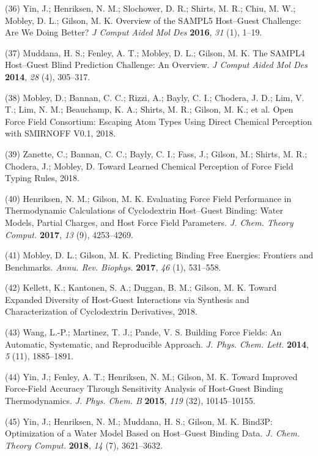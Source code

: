 \documentclass[11pt,notitlepage]{article}
\begin{document}
\leavevmode\hypertarget{ref-BGsUYQln}{}%
(36) Yin, J.; Henriksen, N. M.; Slochower, D. R.; Shirts, M. R.; Chiu,
M. W.; Mobley, D. L.; Gilson, M. K. Overview of the SAMPL5 Host--Guest
Challenge: Are We Doing Better? \emph{J Comput Aided Mol Des}
\textbf{2016}, \emph{31} (1), 1--19.

\leavevmode\hypertarget{ref-GA1AFcUw}{}%
(37) Muddana, H. S.; Fenley, A. T.; Mobley, D. L.; Gilson, M. K. The
SAMPL4 Host--Guest Blind Prediction Challenge: An Overview. \emph{J
Comput Aided Mol Des} \textbf{2014}, \emph{28} (4), 305--317.

\leavevmode\hypertarget{ref-HlBr7NrU}{}%
(38) Mobley, D.; Bannan, C. C.; Rizzi, A.; Bayly, C. I.; Chodera, J. D.;
Lim, V. T.; Lim, N. M.; Beauchamp, K. A.; Shirts, M. R.; Gilson, M. K.;
et al. Open Force Field Consortium: Escaping Atom Types Using Direct
Chemical Perception with SMIRNOFF V0.1, 2018.

\leavevmode\hypertarget{ref-13lTSBgHy}{}%
(39) Zanette, C.; Bannan, C. C.; Bayly, C. I.; Fass, J.; Gilson, M.;
Shirts, M. R.; Chodera, J.; Mobley, D. Toward Learned Chemical
Perception of Force Field Typing Rules, 2018.

\leavevmode\hypertarget{ref-HVgz5rZq}{}%
(40) Henriksen, N. M.; Gilson, M. K. Evaluating Force Field Performance
in Thermodynamic Calculations of Cyclodextrin Host--Guest Binding: Water
Models, Partial Charges, and Host Force Field Parameters. \emph{J. Chem.
Theory Comput.} \textbf{2017}, \emph{13} (9), 4253--4269.

\leavevmode\hypertarget{ref-12BD3oHp4}{}%
(41) Mobley, D. L.; Gilson, M. K. Predicting Binding Free Energies:
Frontiers and Benchmarks. \emph{Annu. Rev. Biophys.} \textbf{2017},
\emph{46} (1), 531--558.

\leavevmode\hypertarget{ref-13gqBX78S}{}%
(42) Kellett, K.; Kantonen, S. A.; Duggan, B. M.; Gilson, M. K. Toward
Expanded Diversity of Host-Guest Interactions via Synthesis and
Characterization of Cyclodextrin Derivatives, 2018.

\leavevmode\hypertarget{ref-JFWYe0Pp}{}%
(43) Wang, L.-P.; Martinez, T. J.; Pande, V. S. Building Force Fields:
An Automatic, Systematic, and Reproducible Approach. \emph{J. Phys.
Chem. Lett.} \textbf{2014}, \emph{5} (11), 1885--1891.

\leavevmode\hypertarget{ref-xRauI5mb}{}%
(44) Yin, J.; Fenley, A. T.; Henriksen, N. M.; Gilson, M. K. Toward
Improved Force-Field Accuracy Through Sensitivity Analysis of Host-Guest
Binding Thermodynamics. \emph{J. Phys. Chem. B} \textbf{2015},
\emph{119} (32), 10145--10155.

\leavevmode\hypertarget{ref-NeqIQDLp}{}%
(45) Yin, J.; Henriksen, N. M.; Muddana, H. S.; Gilson, M. K. Bind3P:
Optimization of a Water Model Based on Host--Guest Binding Data.
\emph{J. Chem. Theory Comput.} \textbf{2018}, \emph{14} (7), 3621--3632.
\end{document}
